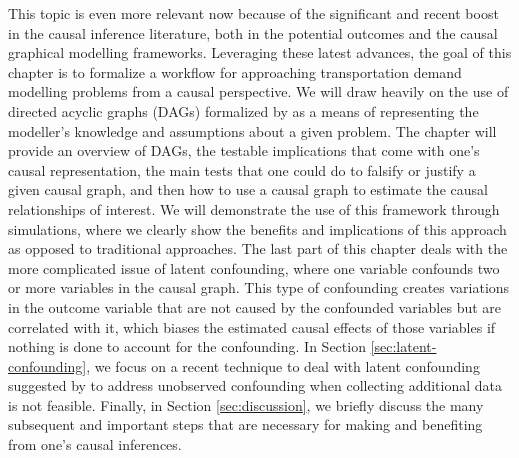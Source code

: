 This topic is even more relevant now because of the significant and recent boost in the causal inference literature, both in the potential outcomes and the causal graphical modelling frameworks.
Leveraging these latest advances, the goal of this chapter is to formalize a workflow for approaching
transportation demand modelling problems from a causal perspective.
We will draw heavily on the use of directed acyclic graphs (DAGs) formalized by \citet{pearl_causality_2000} as a means of representing the modeller's knowledge and assumptions about a given problem.
The chapter will provide an overview of DAGs, the
testable implications that come with one's causal representation, the main
tests that one could do to falsify or justify a given causal graph, and then how
to use a causal graph to estimate the causal relationships of interest.
We will demonstrate the use of this framework through simulations, where we
clearly show the benefits and implications of this approach as opposed to
traditional approaches.
The last part of this chapter deals with the more complicated issue of latent
confounding, where one variable confounds two or more variables in the causal
graph. This type of confounding creates variations in the outcome variable that are not caused by
the confounded variables but are correlated with it, which biases the estimated
causal effects of those variables if nothing is done to account for the
confounding.
In Section \ref{sec:latent-confounding}, we focus on a recent technique to deal with latent confounding suggested by \citet{wang_2019_blessings} to address unobserved confounding when collecting additional data is not feasible.
Finally, in Section \ref{sec:discussion}, we briefly discuss the many subsequent and important steps that are necessary for making and benefiting from one's causal inferences.
